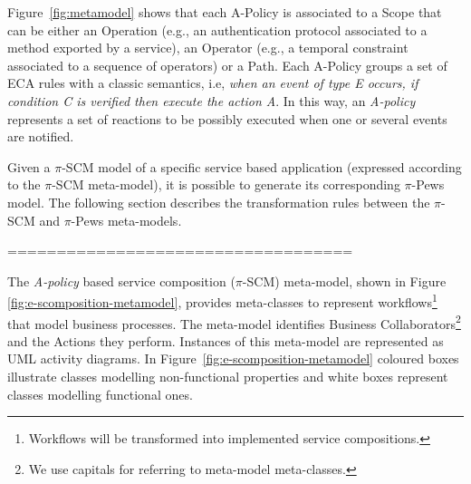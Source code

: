 Figure~\ref{fig:metamodel} shows that each {\sc A-Policy} is associated to a {\sc Scope} that can be either an {\sc Operation} (e.g., an authentication protocol associated to a method exported by a service),  an {\sc Operator} (e.g., a temporal constraint associated to a sequence of operators) or a {\sc Path}.  
Each {\sc A-Policy} groups a set of ECA rules with a classic semantics, i.e, {\em when an event of type E occurs, if condition C is verified then execute the action A}.  
In this way, an {\em A-policy} represents a set of reactions to be possibly executed when one or several events are notified.

Given a $\pi$-SCM model of a specific service based application (expressed according to the $\pi$-SCM meta-model), it is possible to generate its corresponding $\pi$-{\sc Pews} model. 
The following section describes the transformation rules between the $\pi$-SCM and $\pi$-{\sc Pews} meta-models.






===================================

The {\em A-policy} based service composition ($\pi$-SCM) meta-model, shown in Figure \ref{fig:e-scomposition-metamodel},
provides meta-classes to represent workflows\footnote{Workflows will be transformed into implemented service compositions.} that model  business processes.
The meta-model identifies {\sc Business Collaborators}\footnote{We use {\sc capitals} for referring to meta-model meta-classes.} and the {\sc Actions} they perform. 
Instances of this meta-model are represented as UML activity diagrams. 
In Figure~\ref{fig:e-scomposition-metamodel}  coloured boxes illustrate classes  modelling  non-functional properties and 
 white boxes represent classes modelling functional ones. 

